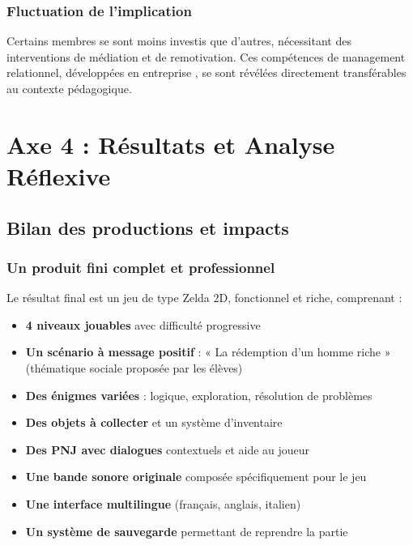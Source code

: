 \subsubsection{Fluctuation de l'implication}
Certains membres se sont moins investis que d'autres, nécessitant des interventions de médiation et de remotivation. Ces compétences de management relationnel, développées en entreprise \parencite{knowles_andragogy}, se sont révélées directement transférables au contexte pédagogique.



\section{Axe 4 : Résultats et Analyse Réflexive}

\subsection{Bilan des productions et impacts}

\subsubsection{Un produit fini complet et professionnel}

Le résultat final est un jeu de type Zelda 2D, fonctionnel et riche, comprenant \parencite{pygame_tutorial} :

\begin{itemize}[leftmargin=*]
    \item \textbf{4 niveaux jouables} avec difficulté progressive
    \item \textbf{Un scénario à message positif} : « La rédemption d'un homme riche » (thématique sociale proposée par les élèves)
    \item \textbf{Des énigmes variées} : logique, exploration, résolution de problèmes
    \item \textbf{Des objets à collecter} et un système d'inventaire
    \item \textbf{Des PNJ avec dialogues} contextuels et aide au joueur
    \item \textbf{Une bande sonore originale} composée spécifiquement pour le jeu
    \item \textbf{Une interface multilingue} (français, anglais, italien)
    \item \textbf{Un système de sauvegarde} permettant de reprendre la partie
\end{itemize}

